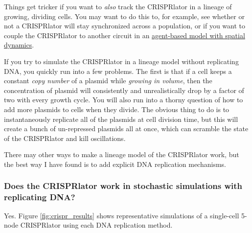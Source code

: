 \documentclass[preprint,12pt]{oldplainarticle}
\begin{document}
Things get tricker if you want to \emph{also} track the CRISPRlator in a lineage of growing, dividing cells. You may want to do this to, for example, see whether or not a CRISPRlator will stay synchronized across a population, or if you want to couple the CRISPRlator to another circuit in an \href{https://depts.washington.edu/soslab/gro/index.html}{agent-based model with spatial dynamics}. 

If you try to simulate the CRISPRlator in a lineage model without replicating DNA, you quickly run into a few problems. The first is that if a cell keeps a constant \emph{copy number} of a plasmid while \emph{growing in volume}, then the concentration of plasmid will consistently and unrealistically drop by a factor of two with every growth cycle. You will also run into a thorny question of how to add more plasmids to cells when they divide. The obvious thing to do is to instantaneously replicate all of the plasmids at cell division time, but this will create a bunch of un-repressed plasmids all at once, which can scramble the state of the CRISPRlator and kill oscillations. 

There may other ways to make a lineage model of the CRISPRlator work, but the best way I have found is to add explicit DNA replication mechanisms. 

\subsubsection{Does the CRISPRlator work in stochastic simulations with replicating DNA?}

Yes. Figure \ref{fig:crispr_results} shows representative simulations of a single-cell 5-node CRISPRlator using each DNA replication method. 
\end{document}
